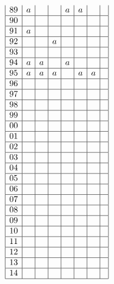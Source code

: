 \documentclass[a4j]{jarticle}
\begin{document}
\begin{align*}
\begin{array}{|c|c|c|c|c|c|c|c|}
          89&a&&&a&a&& \\ \hline
          90&&&&&&& \\ \hline
          91&a&&&&&& \\ \hline
          92&&&a&&&& \\ \hline
          93&&&&&&& \\ \hline
          94&a&a&&a&&& \\ \hline
          95&a&a&a&&a&a& \\ \hline
          96&&&&&&& \\ \hline
          97&&&&&&& \\ \hline
          98&&&&&&& \\ \hline
          99&&&&&&& \\ \hline
          00&&&&&&& \\ \hline
          01&&&&&&& \\ \hline
          02&&&&&&& \\ \hline
          03&&&&&&& \\ \hline
          04&&&&&&& \\ \hline
          05&&&&&&& \\ \hline
          06&&&&&&& \\ \hline
          07&&&&&&& \\ \hline
          08&&&&&&& \\ \hline
          09&&&&&&& \\ \hline
          10&&&&&&& \\ \hline
          11&&&&&&& \\ \hline
          12&&&&&&& \\ \hline
          13&&&&&&& \\ \hline
          14&&&&&&& \\ \hline
          \end{array}
     \end{align*}
\newpage 
\end{document}
